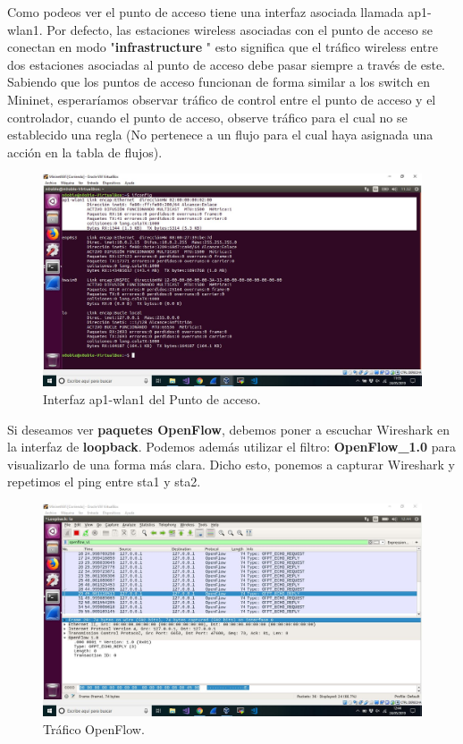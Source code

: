 Como podeos ver el punto de acceso tiene una interfaz asociada llamada ap1-wlan1. Por defecto, las estaciones wireless asociadas con el punto de acceso se conectan en modo "\textbf{infrastructure} " esto significa que el tráfico wireless entre dos estaciones asociadas al punto de acceso debe pasar siempre a través de este. Sabiendo que los puntos de acceso funcionan de forma similar a los switch en Mininet, esperaríamos observar tráfico de control entre el punto de acceso y el controlador, cuando el punto de acceso,  observe tráfico para el cual no se establecido una regla (No pertenece a un flujo para el cual haya asignada una acción en la tabla de flujos). 

\begin{figure}[!htb]
  \centering
    \includegraphics[width=0.9\linewidth]{./img/6.JPG}
    \caption{Interfaz ap1-wlan1 del Punto de acceso.}
  \label{fig:yo}
\end{figure}
\newpage
Si deseamos ver \textbf{paquetes OpenFlow}, debemos poner a escuchar Wireshark  en la interfaz de \textbf{loopback}. Podemos además utilizar el filtro: \textbf{OpenFlow\_1.0} para visualizarlo de una forma más clara. Dicho esto, ponemos a capturar Wireshark y repetimos el ping entre sta1 y sta2.
\begin{figure}[!htb]
  \centering
    \includegraphics[width=\linewidth]{./img/7.JPG}
    \caption{Tráfico OpenFlow.}
  \label{fig:yo}
\end{figure}